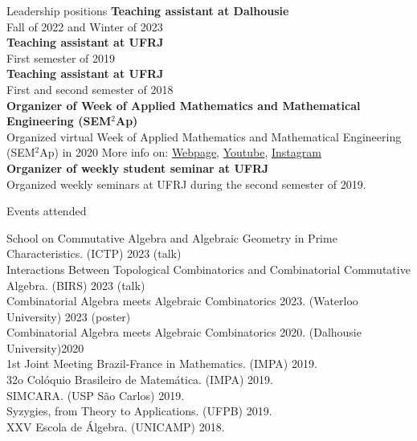 \documentclass{resume} %
\begin{document}

\begin{rSection}{Leadership positions}
{\bf Teaching assistant at Dalhousie}
\\
Fall of 2022 and Winter of 2023
\\
{\bf Teaching assistant at UFRJ} 
\\
First semester of 2019
\\
{\bf Teaching assistant at UFRJ} 
\\
First and second semester of 2018
\\
{\bf Organizer of Week of Applied Mathematics and Mathematical Engineering (SEM$^2$Ap)}
\\
Organized virtual Week of Applied Mathematics and Mathematical Engineering (SEM$^2$Ap) in 2020
{\scriptsize More info on:  \href{http://semap.rio.br}{Webpage},   \href{https://www.youtube.com/channel/UC14NMQ5cOsSuLrAQGGa2T4Q}{Youtube}, 
\href{https://www.instagram.com/semap.rio/}{Instagram}}
\\
{\bf Organizer of weekly student seminar at UFRJ}
\\
Organized weekly seminars at UFRJ during the second semester of 2019.
\end{rSection}

\clearpage


\begin{rSection}{Events attended}

School on Commutative Algebra and Algebraic Geometry in Prime Characteristics. (ICTP) 2023 (talk)
\\ Interactions Between Topological Combinatorics and Combinatorial Commutative Algebra. (BIRS) 2023 (talk)
\\ Combinatorial Algebra meets Algebraic Combinatorics 2023. (Waterloo University) 2023 (poster)%
\\ Combinatorial Algebra meets Algebraic Combinatorics 2020. (Dalhousie University)2020
\\ 1st Joint Meeting Brazil-France in Mathematics. (IMPA) 2019.
\\ 32o Colóquio Brasileiro de Matemática. (IMPA) 2019.
\\ SIMCARA. (USP São Carlos) 2019.
\\ Syzygies, from Theory to Applications. (UFPB) 2019.
\\ XXV Escola de Álgebra. (UNICAMP) 2018.
\\
\end{rSection}


\end{document}
